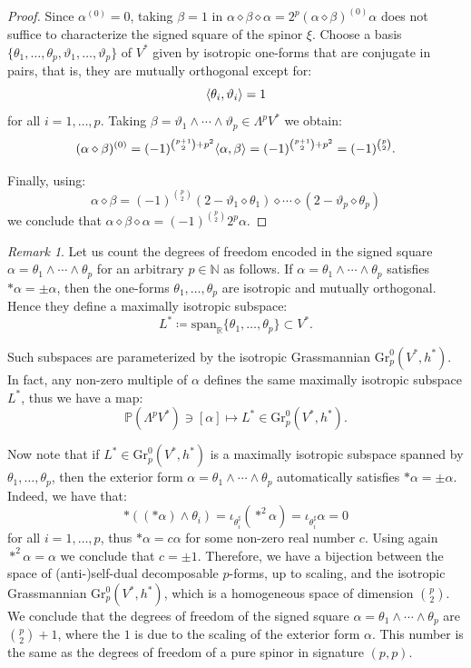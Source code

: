 \documentclass[10pt,reqno]{amsart}
\theoremstyle{definition}
\theoremstyle{remark}
\newtheorem{remark}[theorem]{Remark}
\newcommand{\N}{\mathbb{N}}
\newcommand{\R}{\mathbb{R}}
\DeclarePairedDelimiter{\escal}{\langle}{\rangle}
\begin{document}
\begin{proof}
    Since $\alpha^{(0)}=0$, taking $\beta=1$ in $\alpha\diamond\beta\diamond\alpha=2^p(\alpha\diamond\beta)^{(0)}\alpha$ does not suffice to characterize the signed square of the spinor $\xi$. Choose a basis $\{\theta_1,\ldots,\theta_p,\vartheta_1,\ldots,\vartheta_p\}$ of $V^*$ given by isotropic one-forms that are conjugate in pairs, that is, they are mutually orthogonal except for: $$\escal{\theta_i,\vartheta_i}=1$$ for all $i=1,\ldots,p$. Taking $\beta=\vartheta_1\wedge\cdots\wedge\vartheta_p\in\Lambda^pV^*$ we obtain: $$(\alpha\diamond\beta)^{(0)}=(-1)^{\binom{p+1}{2}+p^2}\escal{\alpha,\beta}=(-1)^{\binom{p+1}{2}+p^2}=(-1)^{\binom{p}{2}}.$$
    
    Finally, using: $$\alpha\diamond\beta=(-1)^{\binom{p}{2}}(2-\vartheta_1\diamond\theta_1)\diamond\cdots\diamond(2-\vartheta_p\diamond\theta_p)$$ we conclude that $\alpha\diamond\beta\diamond\alpha=(-1)^{\binom{p}{2}}2^p\alpha$.
\end{proof}

\begin{remark}
    Let us count the degrees of freedom encoded in the signed square $\alpha=\theta_1\wedge\cdots\wedge\theta_p$ for an arbitrary $p\in\N$ as follows. If $\alpha=\theta_1\wedge\cdots\wedge\theta_p$ satisfies $*\alpha=\pm\alpha$, then the one-forms $\theta_1,\ldots,\theta_p$ are isotropic and mutually orthogonal. Hence they define a maximally isotropic subspace: $$L^*\coloneqq\mathrm{span}_\R\{\theta_1,\ldots,\theta_p\}\subset V^*.$$
    
    Such subspaces are parameterized by the isotropic Grassmannian $\mathrm{Gr}_p^0(V^*,h^*)$. In fact, any non-zero multiple of $\alpha$ defines the same maximally isotropic subspace $L^*$, thus we have a map: $$\mathbb{P}(\Lambda^pV^*)\ni[\alpha]\mapsto L^*\in\mathrm{Gr}_p^0(V^*,h^*).$$
    
    Now note that if $L^*\in\mathrm{Gr}_p^0(V^*,h^*)$ is a maximally isotropic subspace spanned by $\theta_1,\ldots,\theta_p$, then the exterior form $\alpha=\theta_1\wedge\cdots\wedge\theta_p$ automatically satisfies $*\alpha=\pm\alpha$. Indeed, we have that: $$*((*\alpha)\wedge\theta_i)=\iota_{\theta_i^\sharp}(*^2\alpha)=\iota_{\theta_i^\sharp}\alpha=0$$ for all $i=1,\ldots,p$, thus $*\alpha=c\alpha$ for some non-zero real number $c$. Using again $*^2\alpha=\alpha$ we conclude that $c=\pm1$. Therefore, we have a bijection between the space of (anti-)self-dual decomposable $p$-forms, up to scaling, and the isotropic Grassmannian $\mathrm{Gr}_p^0(V^*,h^*)$, which is a homogeneous space of dimension $\binom{p}{2}$. We conclude that the degrees of freedom of the signed square $\alpha=\theta_1\wedge\cdots\wedge\theta_p$ are $\binom{p}{2}+1$, where the $1$ is due to the scaling of the exterior form $\alpha$. This number is the same as the degrees of freedom of a pure spinor in signature $(p,p)$.
\end{remark}
\end{document}
